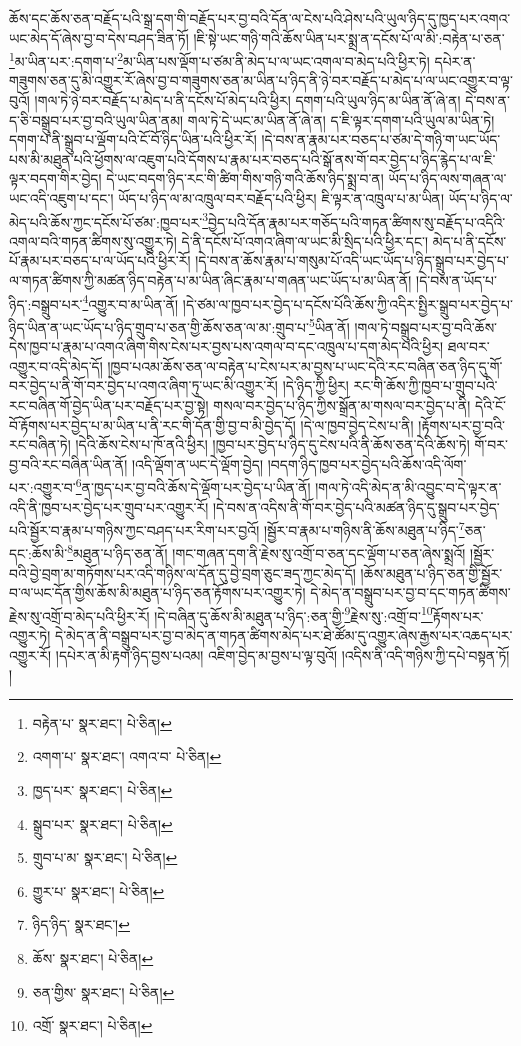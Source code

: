 ཆོས་དང་ཆོས་ཅན་བརྗོད་པའི་སྒྲ་དག་གི་བརྗོད་པར་བྱ་བའི་དོན་ལ་ངེས་པའི་ཤེས་པའི་ཡུལ་ཉིད་དུ་ཁྱད་པར་འགའ་ཡང་མེད་དོ་ཞེས་བྱ་བ་དེས་བཤད་ཟིན་ཏོ། །ཇི་སྟེ་ཡང་གཉི་གའི་ཆོས་ཡིན་པར་སྨྲ་ན་དངོས་པོ་ལ་མི་:བརྟེན་པ་ཅན་\footnote{བརྟེན་པ་  སྣར་ཐང་།  པེ་ཅིན། }མ་ཡིན་པར་:དགག་པ་\footnote{འགག་པ་  སྣར་ཐང་། འགའ་བ་  པེ་ཅིན། }མ་ཡིན་པས་ལྡོག་པ་ཙམ་ནི་མེད་པ་ལ་ཡང་འགལ་བ་མེད་པའི་ཕྱིར་ཏེ། དཔེར་ན་གཟུགས་ཅན་དུ་མི་འགྱུར་རོ་ཞེས་བྱ་བ་གཟུགས་ཅན་མ་ཡིན་པ་ཉིད་ནི་ཉེ་བར་བརྗོད་པ་མེད་པ་ལ་ཡང་འགྱུར་བ་ལྟ་བུའོ། །གལ་ཏེ་ཉེ་བར་བརྗོད་པ་མེད་པ་ནི་དངོས་པོ་མེད་པའི་ཕྱིར། དགག་པའི་ཡུལ་ཉིད་མ་ཡིན་ནོ་ཞེ་ན། དེ་བས་ན་ད་ཅི་བསྒྲུབ་པར་བྱ་བའི་ཡུལ་ཡིན་ནམ། གལ་ཏེ་དེ་ཡང་མ་ཡིན་ནོ་ཞེ་ན། ད་ཇི་ལྟར་དགག་པའི་ཡུལ་མ་ཡིན་ཏེ། དགག་པ་ནི་སྒྲུབ་པ་ལྡོག་པའི་ངོ་བོ་ཉིད་ཡིན་པའི་ཕྱིར་རོ། །དེ་བས་ན་རྣམ་པར་བཅད་པ་ཙམ་དེ་གཉི་ག་ཡང་ཡོད་པས་མི་མཐུན་པའི་ཕྱོགས་ལ་འཇུག་པའི་དོགས་པ་རྣམ་པར་བཅད་པའི་སྒོ་ནས་གོ་བར་བྱེད་པ་ཉིད་རྙེད་པ་ལ་ཇི་ལྟར་བདག་གིར་བྱེད། དེ་ཡང་བདག་ཉིད་རང་གི་ཚིག་གིས་གཉི་གའི་ཆོས་ཉིད་སྨྲ་བ་ན། ཡོད་པ་ཉིད་ལས་གཞན་ལ་ཡང་འདི་འཇུག་པ་དང་། ཡོད་པ་ཉིད་ལ་མ་འཁྲུལ་བར་བརྗོད་པའི་ཕྱིར། ཇི་ལྟར་ན་འཁྲུལ་པ་མ་ཡིན། ཡོད་པ་ཉིད་ལ་མེད་པའི་ཆོས་ཀྱང་དངོས་པོ་ཙམ་:ཁྱབ་པར་\footnote{ཁྱད་པར་  སྣར་ཐང་།  པེ་ཅིན། }བྱེད་པའི་དོན་རྣམ་པར་གཅོད་པའི་གཏན་ཚིགས་སུ་བརྗོད་པ་འདིའི་འགལ་བའི་གཏན་ཚིགས་སུ་འགྱུར་ཏེ། དེ་ནི་དངོས་པོ་འགའ་ཞིག་ལ་ཡང་མི་སྲིད་པའི་ཕྱིར་དང་། མེད་པ་ནི་དངོས་པོ་རྣམ་པར་བཅད་པ་ལ་ཡོད་པའི་ཕྱིར་རོ། །དེ་བས་ན་ཆོས་རྣམ་པ་གསུམ་པོ་འདི་ཡང་ཡོད་པ་ཉིད་སྒྲུབ་པར་བྱེད་པ་ལ་གཏན་ཚིགས་ཀྱི་མཚན་ཉིད་བརྟེན་པ་མ་ཡིན་ཞིང་རྣམ་པ་གཞན་ཡང་ཡོད་པ་མ་ཡིན་ནོ། །དེ་བས་ན་ཡོད་པ་ཉིད་:བསྒྲུབ་པར་\footnote{སྒྲུབ་པར་  སྣར་ཐང་།  པེ་ཅིན། }འགྱུར་བ་མ་ཡིན་ནོ། །དེ་ཙམ་ལ་ཁྱབ་པར་བྱེད་པ་དངོས་པོའི་ཆོས་ཀྱི་འདིར་སྤྱིར་སྒྲུབ་པར་བྱེད་པ་ཉིད་ཡིན་ན་ཡང་ཡོད་པ་ཉིད་གྲུབ་པ་ཅན་གྱི་ཆོས་ཅན་ལ་མ་:གྲུབ་པ་\footnote{གྲུབ་པ་མ་  སྣར་ཐང་།  པེ་ཅིན། }ཡིན་ནོ། །གལ་ཏེ་བསྒྲུབ་པར་བྱ་བའི་ཆོས་དེས་ཁྱབ་པ་རྣམ་པ་འགའ་ཞིག་གིས་ངེས་པར་བྱས་པས་འགལ་བ་དང་འཁྲུལ་པ་དག་མེད་པའི་ཕྱིར། ཐལ་བར་འགྱུར་བ་འདི་མེད་དོ། །ཁྱབ་པའམ་ཆོས་ཅན་ལ་བརྟེན་པ་ངེས་པར་མ་བྱས་པ་ཡང་དེའི་རང་བཞིན་ཅན་ཉིད་དུ་གོ་བར་བྱེད་པ་ནི་གོ་བར་བྱེད་པ་འགའ་ཞིག་ཏུ་ཡང་མི་འགྱུར་རོ། །དེ་ཉིད་ཀྱི་ཕྱིར། རང་གི་ཆོས་ཀྱི་ཁྱབ་པ་གྲུབ་པའི་རང་བཞིན་གོ་བྱེད་ཡིན་པར་བརྗོད་པར་བྱ་སྟེ། གསལ་བར་བྱེད་པ་ཉིད་ཀྱིས་སྒྲོན་མ་གསལ་བར་བྱེད་པ་ནི། དེའི་ངོ་བོ་རྟོགས་པར་བྱེད་པ་མ་ཡིན་པ་ནི་རང་གི་དོན་གྱི་བྱ་བ་མི་བྱེད་དོ། །དེ་ལ་ཁྱབ་བྱེད་ངེས་པ་ནི། །རྟོགས་པར་བྱ་བའི་རང་བཞིན་ཏེ། །དེའི་ཆོས་ངེས་པ་ཁོ་ནའི་ཕྱིར། །ཁྱབ་པར་བྱེད་པ་ཉིད་དུ་ངེས་པའི་ནི་ཆོས་ཅན་དེའི་ཆོས་ཏེ། གོ་བར་བྱ་བའི་རང་བཞིན་ཡིན་ནོ། །འདི་ལྡོག་ན་ཡང་དེ་ལྡོག་བྱེད། །བདག་ཉིད་ཁྱབ་པར་བྱེད་པའི་ཆོས་འདི་ལོག་པར་:འགྱུར་བ་\footnote{གྱུར་པ་  སྣར་ཐང་།  པེ་ཅིན། }ན་ཁྱད་པར་བྱ་བའི་ཆོས་དེ་ལྡོག་པར་བྱེད་པ་ཡིན་ནོ། །གལ་ཏེ་འདི་མེད་ན་མི་འབྱུང་བ་དེ་ལྟར་ན་འདི་ནི་ཁྱབ་པར་བྱེད་པར་གྲུབ་པར་འགྱུར་རོ། །དེ་བས་ན་འདིས་ནི་གོ་བར་བྱེད་པའི་མཚན་ཉིད་དུ་སྒྲུབ་པར་བྱེད་པའི་སྦྱོར་བ་རྣམ་པ་གཉིས་ཀྱང་བཤད་པར་རིག་པར་བྱའོ། །སྦྱོར་བ་རྣམ་པ་གཉིས་ནི་ཆོས་མཐུན་པ་ཉིད་\footnote{ཉིད་ཉིད་  སྣར་ཐང་། }ཅན་དང་:ཆོས་མི་\footnote{ཆོས་  སྣར་ཐང་།  པེ་ཅིན། }མཐུན་པ་ཉིད་ཅན་ནོ། །གང་གཞན་དག་ནི་རྗེས་སུ་འགྲོ་བ་ཅན་དང་ལྡོག་པ་ཅན་ཞེས་སྨྲའོ། །སྦྱོར་བའི་བྱེ་བྲག་མ་གཏོགས་པར་འདི་གཉིས་ལ་དོན་དུ་བྱེ་བྲག་ཅུང་ཟད་ཀྱང་མེད་དོ། །ཆོས་མཐུན་པ་ཉིད་ཅན་གྱི་སྦྱོར་བ་ལ་ཡང་དོན་གྱིས་ཆོས་མི་མཐུན་པ་ཉིད་ཅན་རྟོགས་པར་འགྱུར་ཏེ། དེ་མེད་ན་བསྒྲུབ་པར་བྱ་བ་དང་གཏན་ཚིགས་རྗེས་སུ་འགྲོ་བ་མེད་པའི་ཕྱིར་རོ། །དེ་བཞིན་དུ་ཆོས་མི་མཐུན་པ་ཉིད་:ཅན་གྱི་\footnote{ཅན་གྱིས་  སྣར་ཐང་།  པེ་ཅིན། }རྗེས་སུ་:འགྲོ་བ་\footnote{འགྲོ་  སྣར་ཐང་།  པེ་ཅིན། }རྟོགས་པར་འགྱུར་ཏེ། དེ་མེད་ན་ནི་བསྒྲུབ་པར་བྱ་བ་མེད་ན་གཏན་ཚིགས་མེད་པར་ཐེ་ཚོམ་དུ་འགྱུར་ཞེས་རྒྱས་པར་འཆད་པར་འགྱུར་རོ། །དཔེར་ན་མི་རྟག་ཉིད་བྱས་པའམ། འཇིག་བྱེད་མ་བྱས་པ་ལྟ་བུའོ། །འདིས་ནི་འདི་གཉིས་ཀྱི་དཔེ་བསྟན་ཏོ། །
